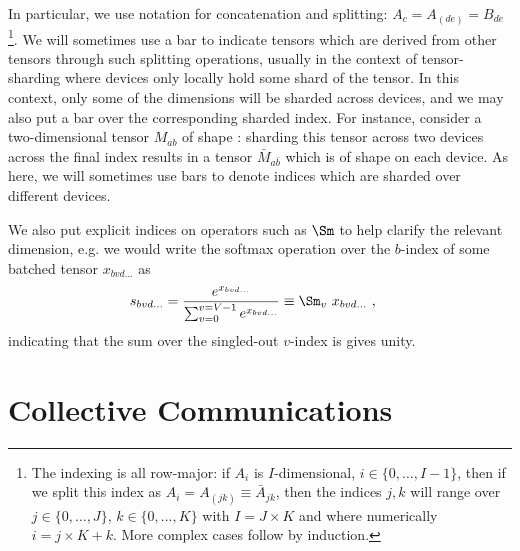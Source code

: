 \documentclass[11pt]{article}
\begin{document}
In particular, we use  notation for concatenation and splitting: $ A _{ c } = A _{
    (de) }= B _{ de } $\footnote{The indexing is all row-major: if $ A _{ i } $ is $
        I$-dimensional, $ i \in \{0, \ldots, I-1\} $, then if we split this index as $ A _{ i } = A
        _{ (jk) } \equiv \bar{A} _{ jk } $, then the indices $ j, k $ will range over $ j \in \{0,
    \ldots , J\} $, $ k\in \{0, \ldots , K\} $ with $ I =J \times K $ and where numerically $ i = j
\times K + k $. More complex cases follow by induction.}. We will sometimes use a bar to indicate
tensors which  are derived from other tensors through such splitting operations, usually in the
context of tensor-sharding where devices only locally hold some shard of the tensor. In this
context, only some of the dimensions will be sharded across devices, and we may also put a bar over
the corresponding sharded index. For instance, consider a two-dimensional tensor $ M _{ ab } $ of
shape : sharding this tensor across two devices across the final index
results in a tensor $ \bar{M}_{ a \bar{b} } $ which is of shape  on
each device. As here, we will sometimes use bars to denote indices which are sharded over different
devices.

We also put explicit indices on operators such as $ \Sm $ to help clarify the relevant
dimension, e.g. we would write the softmax operation over the $ b $-index of some batched
tensor $ x _{ bvd\ldots } $ as
\begin{align}
	s _{ bvd\ldots } & = \frac{ e^{ x _{ bv d\ldots}  } }{ \sum _{ v = 0 } ^{  v= V-1 } e^{ x _{
						bvd\ldots } } } \equiv
	\Sm _{ v } \ x _{ bvd\ldots }
	\ , \label{app_eq_einstein_softmax}
\end{align}
indicating that the sum over the singled-out $ v $-index is gives unity.

\section{Collective Communications \label{app_collective_communications} }
\end{document}
